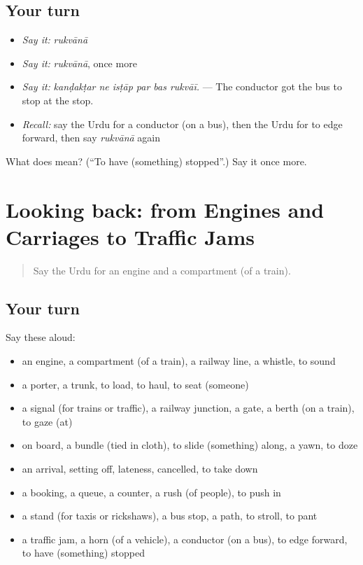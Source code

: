 \subsection*{Your turn}
\begin{itemize}
\raggedright
  \item \emph{Say it:} \emph{rukvānā}
  \item \emph{Say it:} \emph{rukvānā}, once more
  \item \emph{Say it:} \emph{kanḍakṭar ne isṭāp par bas rukvāī.} — The conductor got the bus to stop at the stop.
  \item \emph{Recall:} say the Urdu for a conductor (on a bus), then the Urdu for to edge forward, then say \emph{rukvānā} again
\end{itemize}

\begin{tcolorbox}[breakable,colback=teal!4,colframe=teal!35!black,title={Before you move on}]
What does  mean? (\textquotedblleft{}To have (something) stopped\textquotedblright{}.) Say it once more.
\end{tcolorbox}
\section[(dialogue)]{Looking back: from Engines and Carriages to Traffic Jams}

\label{lesson:UR-R393-review-386-393}



\begin{quote}
Say the Urdu for an engine and a compartment (of a train).
\end{quote}

\subsection*{Your turn}
Say these aloud:

\begin{itemize}
\raggedright
  \item an engine, a compartment (of a train), a railway line, a whistle, to sound
  \item a porter, a trunk, to load, to haul, to seat (someone)
  \item a signal (for trains or traffic), a railway junction, a gate, a berth (on a train), to gaze (at)
  \item on board, a bundle (tied in cloth), to slide (something) along, a yawn, to doze
  \item an arrival, setting off, lateness, cancelled, to take down
  \item a booking, a queue, a counter, a rush (of people), to push in
  \item a stand (for taxis or rickshaws), a bus stop, a path, to stroll, to pant
  \item a traffic jam, a horn (of a vehicle), a conductor (on a bus), to edge forward, to have (something) stopped
\end{itemize}

